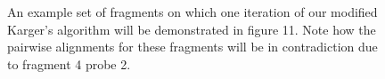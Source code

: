 \documentclass[11pt]{article}
\begin{document}
\begin{figure}[h!]
\begin{center}
\begin{tikzpicture}[scale=1.2]
		
		
		
		

\end{tikzpicture}
 \caption{An example set of fragments on which one iteration of our modified Karger's algorithm will be demonstrated in figure 11. Note how the pairwise alignments for these fragments will be in contradiction due to fragment 4 probe 2.}
\end{center}
\end{figure}
\end{document}
